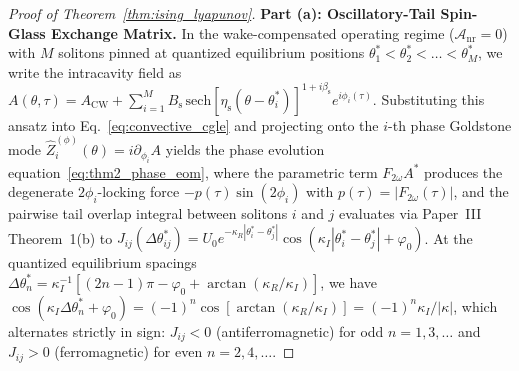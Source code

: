 \documentclass[11pt,letterpaper]{article}
\begin{document}
\begin{proof}[Proof of Theorem~\ref{thm:ising_lyapunov}]
\textbf{Part (a): Oscillatory-Tail Spin-Glass Exchange Matrix.}
In the wake-compensated operating regime ($\mathcal{A}_{\mathrm{nr}} = 0$) with $M$ solitons pinned at quantized equilibrium positions $\theta_1^* < \theta_2^* < \dots < \theta_M^*$, we write the intracavity field as $A(\theta, \tau) = A_{\mathrm{CW}} + \sum_{i=1}^M B_{\mathrm{s}}\,\mathrm{sech}[\eta_{\mathrm{s}}(\theta - \theta_i^*)]^{1+i\beta_{\mathrm{s}}}e^{i\phi_i(\tau)}$. Substituting this ansatz into Eq.~\eqref{eq:convective_cgle} and projecting onto the $i$-th phase Goldstone mode $\hat{Z}_i^{(\phi)}(\theta) = i\partial_{\phi_i}A$ yields the phase evolution equation~\eqref{eq:thm2_phase_eom}, where the parametric term $F_{2\omega}A^*$ produces the degenerate $2\phi_i$-locking force $-p(\tau)\sin(2\phi_i)$ with $p(\tau) = |F_{2\omega}(\tau)|$, and the pairwise tail overlap integral between solitons $i$ and $j$ evaluates via Paper~III Theorem~1(b) to $J_{ij}(\Delta\theta_{ij}^*) = U_0 e^{-\kappa_R|\theta_i^* - \theta_j^*|}\cos(\kappa_I|\theta_i^* - \theta_j^*| + \varphi_0)$. At the quantized equilibrium spacings $\Delta\theta_n^* = \kappa_I^{-1}[(2n-1)\pi - \varphi_0 + \arctan(\kappa_R/\kappa_I)]$, we have $\cos(\kappa_I\Delta\theta_n^* + \varphi_0) = (-1)^n \cos[\arctan(\kappa_R/\kappa_I)] = (-1)^n \kappa_I / |\kappa|$, which alternates strictly in sign: $J_{ij} < 0$ (antiferromagnetic) for odd $n = 1, 3, \dots$ and $J_{ij} > 0$ (ferromagnetic) for even $n = 2, 4, \dots$.


\end{proof}
\end{document}
